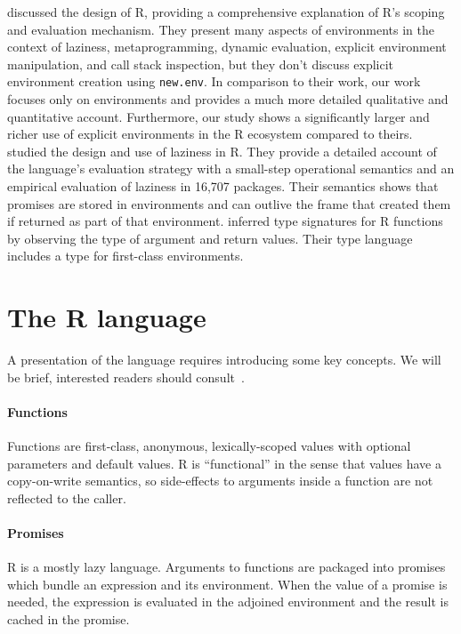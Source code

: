 \documentclass[10pt,review,sigplan,authorversion=true]{acmart}
\newcommand{\code}[1]{\lstinline |#1|\xspace}
\begin{document}
\citet{ecoop12} discussed the design of R, providing a comprehensive explanation
of R's scoping and evaluation mechanism. They present many aspects of
environments in the context of laziness, metaprogramming, dynamic evaluation,
explicit environment manipulation, and call stack inspection, but they don't
discuss explicit environment creation using \code{new.env}. In comparison to
their work, our work focuses only on environments and provides a much more
detailed qualitative and quantitative account. Furthermore, our study shows a
significantly larger and richer use of explicit environments in the R ecosystem
compared to theirs. \citet{oopsla19b} studied the design and use of laziness in
R. They provide a detailed account of the language’s evaluation strategy with a
small-step operational semantics and an empirical evaluation of laziness in
16,707 packages. Their semantics shows that promises are stored in environments
and can outlive the frame that created them if returned as part of that
environment. \citet{oopsla20b} inferred type signatures for R functions by
observing the type of argument and return values. Their type language includes a
type for first-class environments.


\section{The R language}

A presentation of the language requires introducing some key concepts. We will
be brief, interested readers should consult~\cite{AdvancedR}.

\paragraph{Functions} Functions are first-class, anonymous, lexically-scoped values
with optional parameters and default values. R is ``functional'' in the sense
that values have a copy-on-write semantics, so side-effects to arguments inside
a function are not reflected to the caller.

\paragraph{Promises} R is a mostly lazy language. Arguments to functions are
packaged into promises which bundle an expression and its environment. When the
value of a promise is needed, the expression is evaluated in the adjoined
environment and the result is cached in the promise.
\end{document}
